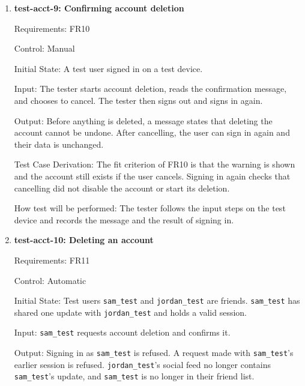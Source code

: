 \documentclass[12pt, titlepage]{article}
\begin{document}
\begin{enumerate}
Test Case Derivation: The fit criterion of FR9 lists the profile, activity
totals, balance, holdings, trades and shared updates, and each has a known
value here so the file can be checked field by field. The balance is
$100 - 2 \cdot 15.00 = 70.00$ for a user who earned 100 from 10,000 steps. The
SRS sets JSON as the format for data that \progname{} exchanges (SRS Section
1.2). The friend's data checks that the copy contains only the requester's
data.

How test will be performed: A pytest test sets up both users through the API,
requests the copy, parses the file, and compares each field with the values
above.

\item{\textbf{test-acct-9: Confirming account deletion}\\}

Requirements: FR10

Control: Manual

Initial State: A test user signed in on a test device.

Input: The tester starts account deletion, reads the confirmation message, and
chooses to cancel. The tester then signs out and signs in again.

Output: Before anything is deleted, a message states that deleting the
account cannot be undone. After cancelling, the user can sign in again and
their data is unchanged.

Test Case Derivation: The fit criterion of FR10 is that the warning is shown
and the account still exists if the user cancels. Signing in again checks
that cancelling did not disable the account or start its deletion.

How test will be performed: The tester follows the input steps on the test
device and records the message and the result of signing in.

\item{\textbf{test-acct-10: Deleting an account}\\}

Requirements: FR11

Control: Automatic

Initial State: Test users \texttt{sam\_test} and \texttt{jordan\_test} are
friends. \texttt{sam\_test} has shared one update with \texttt{jordan\_test}
and holds a valid session.

Input: \texttt{sam\_test} requests account deletion and confirms it.

Output: Signing in as \texttt{sam\_test} is refused. A request made with
\texttt{sam\_test}'s earlier session is refused. \texttt{jordan\_test}'s
social feed no longer contains \texttt{sam\_test}'s update, and
\texttt{sam\_test} is no longer in their friend list.


\end{enumerate}
\end{document}
